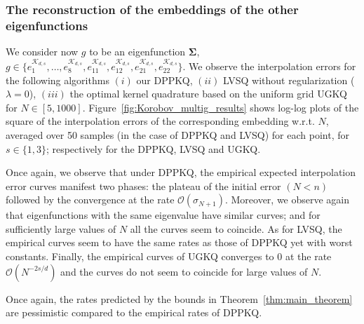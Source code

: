 \documentclass[twoside,11pt]{book}
\numberwithin{theorem}{chapter}
\numberwithin{definition}{chapter}
\numberwithin{proposition}{chapter}
\numberwithin{corollary}{chapter}
\numberwithin{example}{chapter}
\numberwithin{lemma}{chapter}
\numberwithin{assumption}{chapter}
\numberwithin{equation}{chapter}
\numberwithin{figure}{chapter}
\begin{document}
\subsubsection{The reconstruction of the embeddings of the other eigenfunctions}

We consider now $g$ to be an eigenfunction $\bm{\Sigma}$, $g \in \{e_{1}^{\mathcal{K}_{d,s}},\dots,e_{8}^{\mathcal{K}_{d,s}},e_{11}^{\mathcal{K}_{d,s}},e_{12}^{\mathcal{K}_{d,s}},e_{21}^{\mathcal{K}_{d,s}},e_{22}^{\mathcal{K}_{d,s}}\}$. We observe the interpolation errors for the following algorithms $(i)$ our DPPKQ, $(ii)$ LVSQ without regularization ($\lambda =0$), $(iii)$ the optimal kernel quadrature based on the uniform grid UGKQ for $N \in [5,1000]$. Figure~\ref{fig:Korobov_multig_results} shows log-log plots of the square of the interpolation errors of the corresponding embedding  w.r.t. $N$, averaged over 50 samples (in the case of DPPKQ and LVSQ) for each point, for $s \in \{1,3\}$; respectively for the DPPKQ, LVSQ and UGKQ.

Once again, we observe that under DPPKQ, the empirical expected interpolation error  curves manifest two phases: the plateau of the initial error $(N<n)$ followed by the convergence at the rate $\mathcal{O}(\sigma_{N+1})$. Moreover, we observe again that eigenfunctions with the same eigenvalue have similar curves; and for sufficiently large values of $N$ all the curves seem to coincide. As for LVSQ, the empirical curves seem to have the same rates as those of DPPKQ yet with worst constants. Finally, the empirical curves of UGKQ converges to $0$ at the rate $\mathcal{O}(N^{-2s/d})$ and the curves do not seem to coincide for large values of $N$.

Once again, the rates predicted by the bounds in Theorem~\ref{thm:main_theorem} are pessimistic compared to the empirical rates of DPPKQ. 
\end{document}
